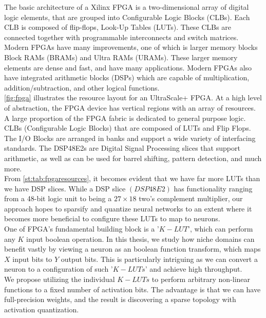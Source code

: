 The basic architecture of a Xilinx FPGA is a two-dimensional array of digital logic elements, that are grouped into Configurable Logic Blocks (CLBs). Each CLB is composed of flip-flops, Look-Up Tables (LUTs). These CLBs are connected together with programmable interconnects and switch matrices. Modern FPGAs have many improvements, one of which is larger memory blocks Block RAMs (BRAMs) and Ultra RAMs (URAMs). These larger memory elements are dense and fast, and have many applications. Modern FPGAs also have integrated arithmetic blocks (DSPs) which are capable of multiplication, addition/subtraction, and other logical functions. \\
\cref{fig:fpga} illustrates the resource layout for an UltraScale+ FPGA. At a high level of abstraction, the FPGA device has vertical regions with an array of resources. A large proportion of the FPGA fabric is dedicated to general purpose logic. CLBs (Configurable Logic Blocks) that are composed of LUTs and Flip Flops. The I/O Blocks are arranged in banks and support a wide variety of interfacing standards. The DSP48E2s are Digital Signal Processing slices that support arithmetic, as well as can be used for barrel shifting, pattern detection, and much more.\\
From \cref{st:tab:fpgaresources}, it becomes evident that we have far more LUTs than we have DSP slices. While a DSP slice $(DSP48E2)$ has functionality ranging from a 48-bit logic unit to being a $27\times18$ two's complement multiplier, our approach hopes to sparsify and quantize neural networks to an extent where it becomes more beneficial to configure these LUTs to map to neurons. \\
One of FPGA's fundamental building block is a '$K-LUT$', which can perform any $K$ input boolean operation. In this thesis, we study how niche domains can benefit vastly by viewing a neuron as an boolean function transform, which maps $X$ input bits to $Y$ output bits. This is particularly intriguing as we can convert a neuron to a configuration of such '$K-LUTs$' and achieve high throughput. \\ 

We propose utilizing the individual $K-LUTs$ to perform arbitrary non-linear functions to a fixed number of activation bits. The advantage is that we can have full-precision weights, and the result is discovering a sparse topology with activation quantization. 



